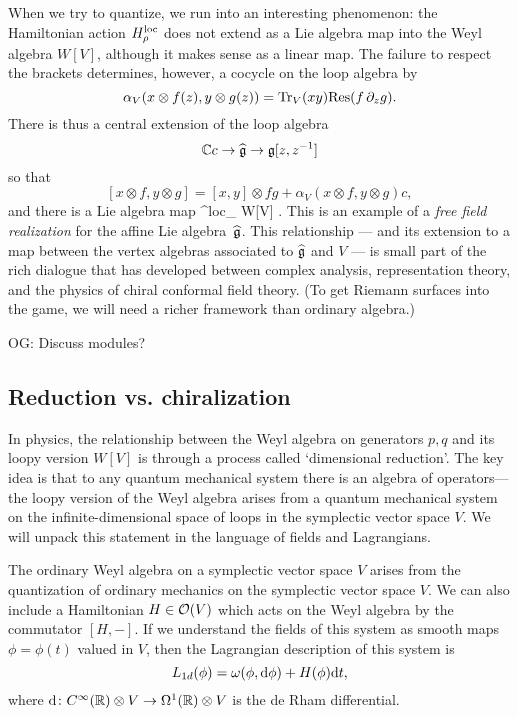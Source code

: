 \documentclass[11pt]{amsart}
\def\owen#1{{\textcolor{violet!65!black}{OG: {#1}}}}
\begin{document}
When we try to quantize, we run into an interesting phenomenon:
the Hamiltonian action $H_\rho^{\rm loc}$ does not extend as a Lie algebra map into the Weyl algebra $W[V]$,
although it makes sense as a linear map.
The failure to respect the brackets determines, however, a cocycle on the loop algebra
by
\[
\alpha_V( x \otimes f(z) , y \otimes g(z)) = {\rm Tr}_V(xy) {\rm Res}(f \, \partial_z g).
\]
There is thus a central extension of the loop algebra 
\[
\mathbb C c \to \widehat{\mathfrak g} \to \mathfrak g[z,z^{-1}]
\]
so that 
\[
[x \otimes f, y \otimes g] = [x,y] \otimes fg + \alpha_V( x \otimes f , y \otimes g) c,
\]
and there is a Lie algebra map
\beqn\label{eqn:freefield1}
^{\rm loc}_\rho \colon \widehat{\fg} \to W[V] .
\eeqn
This is an example of a {\em free field realization} for the affine Lie algebra~$\widehat{\mathfrak g}$.
This relationship --- and its extension to a map between the vertex algebras associated to $\widehat{\mathfrak g}$ and $V$ --- is small part of the rich dialogue that has developed between complex analysis, representation theory, and the physics of chiral conformal field theory.
(To get Riemann surfaces into the game, we will need a richer framework than ordinary algebra.)

\owen{Discuss modules?}

\subsection{Reduction vs. chiralization}

In physics, the relationship between the Weyl algebra on generators $p,q$ and its loopy version $W[V]$ is through a process called `dimensional reduction'.
The key idea is that to any quantum mechanical system there is an algebra of operators---the loopy version of the Weyl algebra arises from a quantum mechanical system on the infinite-dimensional space of loops in the symplectic vector space $V$. 
We will unpack this statement in the language of fields and Lagrangians.

The ordinary Weyl algebra on a symplectic vector space $V$ arises from the quantization of ordinary mechanics on the symplectic vector space $V$.
We can also include a Hamiltonian $H \in \mathcal O(V)$ which acts on the Weyl algebra by the commutator $[H,-]$.
If we understand the fields of this system as smooth maps $\phi = \phi(t)$ valued in $V$, then the Lagrangian description of this system is 
\[
L_{1d} (\phi) = \omega(\phi , {\rm d} \phi) + H(\phi) {\rm d} t ,
\]
where ${\rm d} \colon C^\infty(\mathbb R) \otimes V \to \Omega^1(\mathbb R) \otimes V$ is the de Rham differential. 
\end{document}
